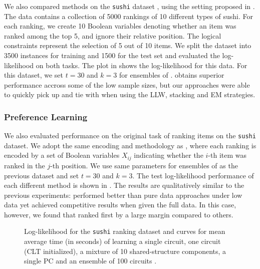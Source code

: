 We also compared methods on the \texttt{sushi} dataset \citep{kamishima03}, using the setting
proposed in \citet{shen17}. The data contains a collection of \num{5000} rankings of \num{10}
different types of sushi. For each ranking, we create \num{10} Boolean variables denoting whether
an item was ranked among the top 5, and ignore their relative position. The logical constraints
represent the selection of \num{5} out of \num{10} items. We split the dataset into \num{3500}
instances for training and \num{1500} for the test set and evaluated the log-likelihood on both
tasks. The plot in  shows the log-likelihood for this data. For this
dataset, we set $t=30$ and $k=3$ for ensembles of . 
obtains superior performance accross some of the low sample sizes, but our approaches were able to
quickly pick up and tie with  when using the LLW, stacking and EM strategies.

\subsubsection{Preference Learning}

We also evaluated performance on the original task of ranking items on the \texttt{sushi} dataset.
We adopt the same encoding and methodology as \citep{choi15}, where each ranking is encoded by a
set of Boolean variables $X_{ij}$ indicating whether the $i$-th item was ranked in the $j$-th
position. We use same parameters for ensembles of  as the previous dataset and
set $t=30$ and $k=3$. The test log-likelihood performance of each different method is shown in
. The results are qualitatively similar to the previous experiments:
 performed better than pure data approaches under low data yet achieved
competitive results when given the full data. In this case, however, we found that
 ranked first by a large margin compared to others.

\begin{figure}[t]
  \begin{subfigure}{0.495\textwidth}
    \caption{}
    \label{fig:ll-sushi-ranking}
  \end{subfigure}
  \begin{subfigure}{0.495\textwidth}
    \caption{}
    \label{fig:sushi-time}
  \end{subfigure}
  \caption{Log-likelihood for the \texttt{sushi} ranking  dataset and curves for
    mean average time (in seconds) of learning a single  circuit, one
     circuit (CLT initialized), a mixture of 10 shared-structure
     components, a single  PC and an ensemble of 100
     circuits .}
  \label{fig:ll-preference}
\end{figure}

